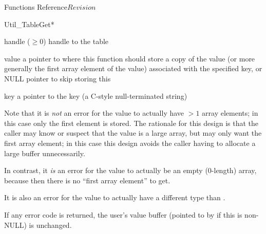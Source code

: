 \begin{cactuspart}{ Functions Reference}{}{$Revision$}
\begin{FunctionDescription}{Util\_TableGet*}
\begin{ParameterSection}
\begin{Parameter}{handle ($\ge 0$)}
handle to the table
\end{Parameter}
\begin{Parameter}{value}
a pointer to where this function should store a copy of the value
(or more generally the first array element of the value) associated
with the specified key,
or NULL pointer to skip storing this
\end{Parameter}
\begin{Parameter}{key}
a pointer to the key (a C-style null-terminated string)
\end{Parameter}
\end{ParameterSection}

\begin{Discussion}
Note that it is {\em not\/} an error for the value to actually have
$> 1$ array elements; in this case only the first element is stored.
The rationale for this design is that the caller may know or suspect
that the value is a large array, but may only want the first array
element; in this case this design avoids the caller having to allocate
a large buffer unnecessarily.

In contrast, it {\em is\/} an error for the value to actually be an
empty (0-length) array, because then there is no ``first array element''
to get.

It is also an error for the value to actually have a different type
than .

If any error code is returned, the user's value buffer
(pointed to by  if this is non-NULL) is unchanged.
\end{Discussion}


\end{FunctionDescription}
\end{cactuspart}
